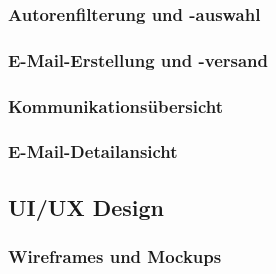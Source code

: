 \documentclass[11pt,a4paper]{article}
\begin{document}
\subsubsection{Autorenfilterung und -auswahl}

\subsubsection{E-Mail-Erstellung und -versand}

\subsubsection{Kommunikationsübersicht}

\subsubsection{E-Mail-Detailansicht}

\subsection{UI/UX Design}

\subsubsection{Wireframes und Mockups}
\end{document}
